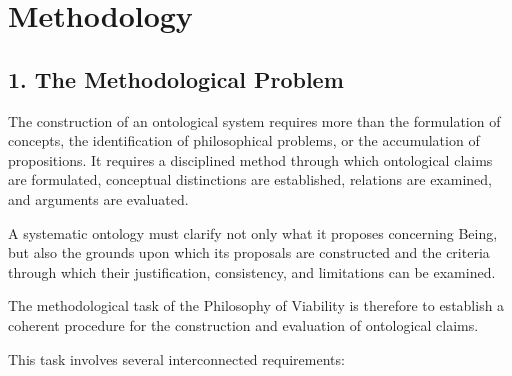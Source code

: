 
\cleardoublepage

\chapter*{Methodology}


\section*{1. The Methodological Problem}

The construction of an ontological system requires
more than the formulation of concepts, the identification
of philosophical problems, or the accumulation of
propositions. It requires a disciplined method through
which ontological claims are formulated, conceptual
distinctions are established, relations are examined,
and arguments are evaluated.

A systematic ontology must clarify not only what it
proposes concerning Being, but also the grounds upon
which its proposals are constructed and the criteria
through which their justification, consistency,
and limitations can be examined.

The methodological task of the Philosophy of Viability
is therefore to establish a coherent procedure for
the construction and evaluation of ontological claims.

This task involves several interconnected requirements:

